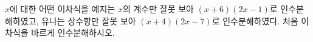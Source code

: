 $x$에 대한 어떤 이차식을 예지는 $x$의 계수만 잘못 보아 $(x+6)(2x-1)$로 인수분해하였고, 유나는 상수항만 잘못 보아 $(x+4)(2x-7)$로 인수분해하였다. 처음 이차식을 바르게 인수분해하시오.
